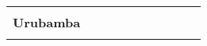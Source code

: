 \begin{tabular}{lccccccccc}
	&\cellcolor[HTML]{FCC46C}					&\cellcolor[HTML]{FCC46C}\\
	\textbf{Urubamba}                                                      	
	&\cellcolor[HTML]{FCC46C} 					&\cellcolor[HTML]{FCC46C}					&\cellcolor[HTML]{FCC46C}					&\cellcolor[HTML]{FCC46C}					&\cellcolor[HTML]{FCC46C}					&\cellcolor[HTML]{FCC46C}					&\cellcolor[HTML]{FCC46C}					&\cellcolor[HTML]{FCC46C}
	&\cellcolor[HTML]{FCC46C}\\	
	&\multicolumn{1}{l}{}                       &\multicolumn{1}{l}{}            &\multicolumn{1}{l}{}                         
	&\multicolumn{1}{l}{}                       &\multicolumn{1}{l}{}            &\multicolumn{1}{l}{}                       &\multicolumn{1}{l}{}                       &\multicolumn{1}{l}{}            			&\multicolumn{1}{l}{}    
\end{tabular}